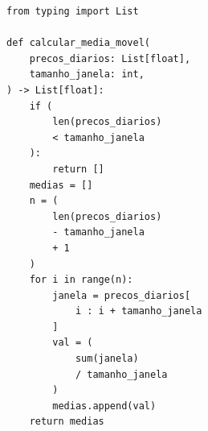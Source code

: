 \ifmostrarGabarito
\begin{verbatim}
from typing import List

def calcular_media_movel(
    precos_diarios: List[float],
    tamanho_janela: int,
) -> List[float]:
    if (
        len(precos_diarios)
        < tamanho_janela
    ):
        return []
    medias = []
    n = (
        len(precos_diarios)
        - tamanho_janela
        + 1
    )
    for i in range(n):
        janela = precos_diarios[
            i : i + tamanho_janela
        ]
        val = (
            sum(janela)
            / tamanho_janela
        )
        medias.append(val)
    return medias
\end{verbatim}

\fi
